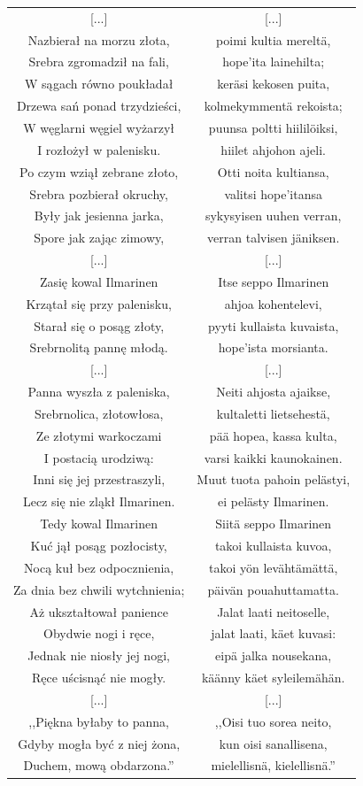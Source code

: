 \documentclass[11pt,a4paper,twoside]{report}
\begin{document}
{\centering
\small
\begin{longtable}{c c}
{[...]} & {[...]}\\
Nazbierał na morzu złota, & poimi kultia mereltä, \\
Srebra zgromadził na fali, & hope'ita lainehilta; \\
W sągach równo poukładał & keräsi kekosen puita, \\
Drzewa sań ponad trzydzieści, & kolmekymmentä rekoista; \\
W węglarni węgiel wyżarzył & puunsa poltti hiililöiksi, \\
I rozłożył w palenisku. & hiilet ahjohon ajeli. \\
Po czym wziął zebrane złoto, & Otti noita kultiansa, \\
Srebra pozbierał okruchy, & valitsi hope'itansa \\
Były jak jesienna jarka, & sykysyisen uuhen verran, \\
Spore jak zając zimowy, & verran talvisen jäniksen. \\
{[...]} & {[...]} \\
Zasię kowal Ilmarinen & Itse seppo Ilmarinen \\
Krzątał się przy palenisku, & ahjoa kohentelevi, \\
Starał się o posąg złoty, & pyyti kullaista kuvaista, \\
Srebrnolitą pannę młodą. & hope'ista morsianta. \\
{[...]} & {[...]} \\
Panna wyszła z paleniska, & Neiti ahjosta ajaikse, \\
Srebrnolica, złotowłosa, & kultaletti lietsehestä, \\
Ze złotymi warkoczami & pää hopea, kassa kulta, \\
I postacią urodziwą: & varsi kaikki kaunokainen. \\
Inni się jej przestraszyli, & Muut tuota pahoin pelästyi, \\
Lecz się nie zląkł Ilmarinen. & ei pelästy Ilmarinen. \\
Tedy kowal Ilmarinen & Siitä seppo Ilmarinen \\
Kuć jął posąg pozłocisty, & takoi kullaista kuvoa, \\
Nocą kuł bez odpocznienia, & takoi yön levähtämättä, \\
Za dnia bez chwili wytchnienia; & päivän pouahuttamatta. \\
Aż ukształtował panience & Jalat laati neitoselle, \\
Obydwie nogi i ręce, & jalat laati, käet kuvasi: \\
Jednak nie niosły jej nogi, & eipä jalka nousekana, \\
Ręce uścisnąć nie mogły. & käänny käet syleilemähän. \\
{[...]} & {[...]} \\
,,Piękna byłaby to panna, & ,,Oisi tuo sorea neito, \\
Gdyby mogła być z niej żona, & kun oisi sanallisena, \\
Duchem, mową obdarzona.'' & mielellisnä, kielellisnä.'' \\
\end{longtable}
}
\end{document}
